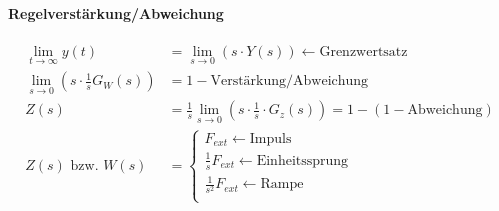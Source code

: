 \documentclass{article}
\begin{document}
\begin{landscape}
\begin{multicols}{2}
\begin{multicols}{2}
\begin{multicols}{2}
\end{multicols}

%
%
%
%	


\paragraph{Regelverstärkung/Abweichung}
	\begin{align*}
		\lim _{t \rightarrow \infty} y(t) &=\lim _{s \rightarrow 0}(s \cdot Y(s)) \leftarrow \text{Grenzwertsatz}\\
		\lim_{s\rightarrow0} \left(s\cdot\frac{1}{s} G_W(s)\right) &= 1 - \text{Verstärkung/Abweichung} \\
		Z(s) &=\frac{1}{s} \lim _{s \rightarrow 0} \left(s \cdot \frac{1}{s} \cdot G_{z}(s)\right) = 1 -( 1- \text{Abweichung} ) \\
		Z(s) \text{ bzw. } W(s) &=
    \begin{cases}
      F_{ext} \leftarrow \text{Impuls}\\
      \frac{1}{s}F_{ext}\leftarrow \text{Einheitssprung}\\
      \frac{1}{s^2}F_{ext}\leftarrow \text{Rampe}\\
    \end{cases} 
	\end{align*}



\end{multicols}
\end{multicols}
\end{landscape}
\end{document}
